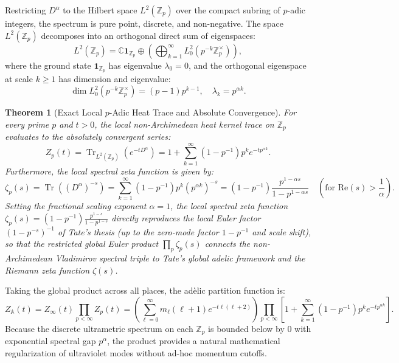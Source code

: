 \documentclass[11pt,a4paper]{article}
\newtheorem{theorem}{Theorem}[section]
\theoremstyle{definition}
\DeclareMathOperator{\Tr}{Tr}
\begin{document}
Restricting $D^\alpha$ to the Hilbert space $L^2(\mathbb{Z}_p)$ over the compact subring of $p$-adic integers, the spectrum is pure point, discrete, and non-negative. The space $L^2(\mathbb{Z}_p)$ decomposes into an orthogonal direct sum of eigenspaces:
\begin{equation}
L^2(\mathbb{Z}_p) = \mathbb{C} \mathbf{1}_{\mathbb{Z}_p} \oplus \left( \bigoplus_{k=1}^\infty L_0^2(p^{-k} \mathbb{Z}_p^\times) \right),
\end{equation}
where the ground state $\mathbf{1}_{\mathbb{Z}_p}$ has eigenvalue $\lambda_0 = 0$, and the orthogonal eigenspace at scale $k \ge 1$ has dimension and eigenvalue:
\begin{equation}
\dim L_0^2(p^{-k} \mathbb{Z}_p^\times) = (p - 1) p^{k-1}, \quad \lambda_k = p^{\alpha k}.
\end{equation}

\begin{theorem}[Exact Local $p$-Adic Heat Trace and Absolute Convergence]
For every prime $p$ and $t > 0$, the local non-Archimedean heat kernel trace on $\mathbb{Z}_p$ evaluates to the absolutely convergent series:
\begin{equation}
Z_p(t) = \Tr_{L^2(\mathbb{Z}_p)}\left(e^{-t D^\alpha}\right) = 1 + \sum_{k=1}^\infty (1 - p^{-1}) p^k e^{-t p^{\alpha k}}.
\end{equation}
Furthermore, the local spectral zeta function is given by:
\begin{equation}
\zeta_p(s) = \Tr\left((D^\alpha)^{-s}\right) = \sum_{k=1}^\infty (1 - p^{-1}) p^k (p^{\alpha k})^{-s} = (1 - p^{-1}) \frac{p^{1 - \alpha s}}{1 - p^{1 - \alpha s}} \quad \left(\text{for } \mathrm{Re}(s) > \frac{1}{\alpha}\right).
\end{equation}
Setting the fractional scaling exponent $\alpha = 1$, the local spectral zeta function $\zeta_p(s) = (1-p^{-1})\frac{p^{1-s}}{1-p^{1-s}}$ directly reproduces the local Euler factor $(1-p^{-s})^{-1}$ of Tate's thesis (up to the zero-mode factor $1-p^{-1}$ and scale shift), so that the restricted global Euler product $\prod_p \zeta_p(s)$ connects the non-Archimedean Vladimirov spectral triple to Tate's global adelic framework and the Riemann zeta function $\zeta(s)$.
\end{theorem}

Taking the global product across all places, the ad\`elic partition function is:
\begin{equation}
Z_{\mathbb{A}}(t) = Z_\infty(t) \prod_{p < \infty} Z_p(t) = \left( \sum_{\ell=0}^\infty m_\ell (\ell+1) e^{-t \ell(\ell+2)} \right) \prod_{p < \infty} \left[ 1 + \sum_{k=1}^\infty (1 - p^{-1}) p^k e^{-t p^{\alpha k}} \right].
\end{equation}
Because the discrete ultrametric spectrum on each $\mathbb{Z}_p$ is bounded below by 0 with exponential spectral gap $p^\alpha$, the product provides a natural mathematical regularization of ultraviolet modes without ad-hoc momentum cutoffs.
\end{document}
